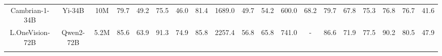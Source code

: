 \begin{table*}[ht]
{\begin{tabular}{ccc|cccccccccccccccc}
        \rowcolor{tablegray}
        Cambrian-1-34B & \hspace{-0.9em}Yi-34B & \hspace{-0.9em}10M & \hspace{-0.5em}79.7 & \hspace{-0.9em}49.2 & \hspace{-0.9em}75.5 & \hspace{-0.9em}46.0 & \hspace{-0.9em}81.4 & \hspace{-0.9em}1689.0 & \hspace{-0.9em}49.7 & \hspace{-0.9em}54.2 & \hspace{-0.9em}600.0 & \hspace{-0.9em}68.2 & \hspace{-0.9em}79.7 & \hspace{-0.9em}67.8 & \hspace{-0.9em}75.3 & \hspace{-0.9em}76.8 & \hspace{-0.9em}76.7 & \hspace{-0.9em}41.6 \\ 
        \rowcolor{tablegray}
        L.OneVision-72B & \hspace{-0.9em}Qwen2-72B & \hspace{-0.9em}5.2M & \hspace{-0.5em}85.6 & \hspace{-0.9em}63.9 & \hspace{-0.9em}91.3 & \hspace{-0.9em}74.9 & \hspace{-0.9em}85.8 & \hspace{-0.9em}2257.4 & \hspace{-0.9em}56.8 & \hspace{-0.9em}65.8 & \hspace{-0.9em}741.0 & \hspace{-0.9em}- & \hspace{-0.9em}86.6 & \hspace{-0.9em}71.9 & \hspace{-0.9em}77.5 & \hspace{-0.9em}90.2 & \hspace{-0.9em}80.5 & \hspace{-0.9em}47.9 \\ 
        \rowcolor{tablegray}

\end{tabular}}
\end{table*}
